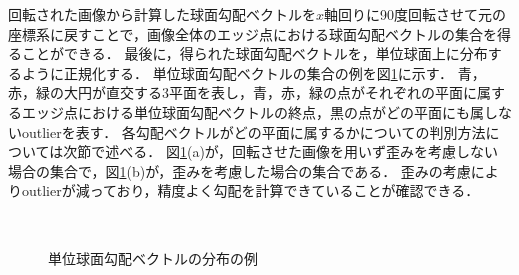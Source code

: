 \newpage

回転された画像から計算した球面勾配ベクトルを$x$軸回りに90度回転させて元の座標系に戻すことで，画像全体のエッジ点における球面勾配ベクトルの集合を得ることができる．
最後に，得られた球面勾配ベクトルを，単位球面上に分布するように正規化する．
単位球面勾配ベクトルの集合の例を図\ref{fig:distribution}に示す．
青，赤，緑の大円が直交する3平面を表し，青，赤，緑の点がそれぞれの平面に属するエッジ点における単位球面勾配ベクトルの終点，黒の点がどの平面にも属しないoutlierを表す．
各勾配ベクトルがどの平面に属するかについての判別方法については次節で述べる．
図\ref{fig:distribution}(a)が，回転させた画像を用いず歪みを考慮しない場合の集合で，図\ref{fig:distribution}(b)が，歪みを考慮した場合の集合である．
歪みの考慮によりoutlierが減っており，精度よく勾配を計算できていることが確認できる．


\setlength
\subfigcapskip{-0.6ex}
\begin{figure}[tb]
	\begin{center}
		\\
	\caption{単位球面勾配ベクトルの分布の例}
	\label{fig:distribution}
	\end{center}
\end{figure}

